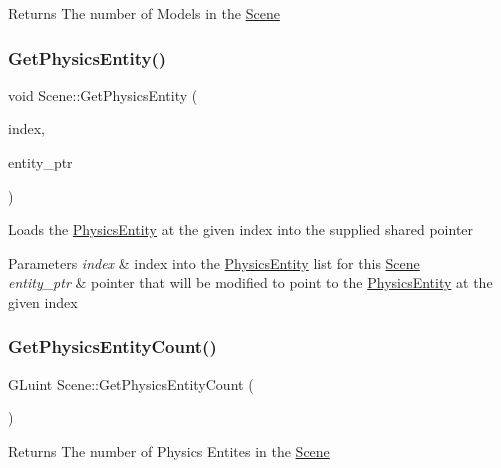 \begin{DoxyReturn}{Returns}
The number of Models in the \hyperlink{classScene}{Scene} 
\end{DoxyReturn}
\mbox{\label{classScene_ac20558c7452d933ce3ebe8caa1514702}} 
\subsubsection{\texorpdfstring{Get\+Physics\+Entity()}{GetPhysicsEntity()}}
{\footnotesize\ttfamily void Scene\+::\+Get\+Physics\+Entity (\begin{DoxyParamCaption}\item[{const G\+Luint}]{index,  }\item[{std\+::shared\+\_\+ptr$<$ \hyperlink{classPhysicsEntity}{Physics\+Entity} $>$ \&}]{entity\+\_\+ptr }\end{DoxyParamCaption})}

Loads the \hyperlink{classPhysicsEntity}{Physics\+Entity} at the given index into the supplied shared pointer 
\begin{DoxyParams}{Parameters}
{\em index} & index into the \hyperlink{classPhysicsEntity}{Physics\+Entity} list for this \hyperlink{classScene}{Scene} \\
\hline
{\em entity\+\_\+ptr} & pointer that will be modified to point to the \hyperlink{classPhysicsEntity}{Physics\+Entity} at the given index \\
\hline
\end{DoxyParams}
\mbox{\label{classScene_a2cadf8fe478a7e3a270902a0536751a9}} 
\subsubsection{\texorpdfstring{Get\+Physics\+Entity\+Count()}{GetPhysicsEntityCount()}}
{\footnotesize\ttfamily G\+Luint Scene\+::\+Get\+Physics\+Entity\+Count (\begin{DoxyParamCaption}{ }\end{DoxyParamCaption})}

\begin{DoxyReturn}{Returns}
The number of Physics Entites in the \hyperlink{classScene}{Scene} 
\end{DoxyReturn}
\mbox{\label{classScene_a7edc9fabe7ef61a426cd6278a0b209fe}} 
